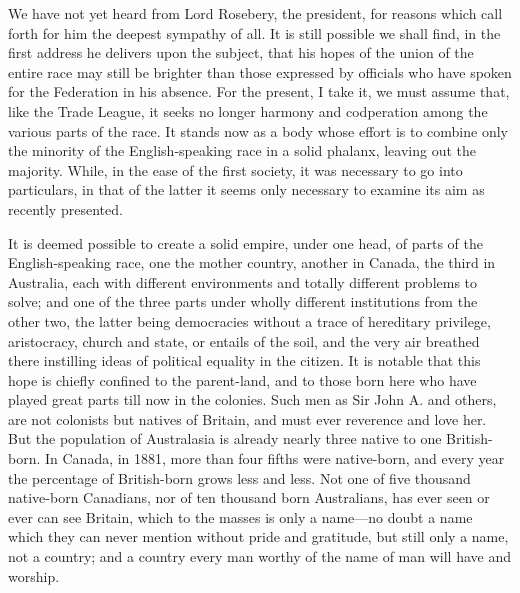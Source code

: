 \documentclass[11pt,openany]{book}
\begin{document}
We have not yet heard from Lord Rosebery, the president, for reasons which call forth for him the deepest sympathy of all. It is still possible we shall find, in the first address he delivers upon the subject, that his hopes of the union of the entire race may still be brighter than those expressed by officials who have spoken for the Federation in his absence. For the present, I take it, we must assume that, like the Trade League, it seeks no longer harmony and codperation among the various parts of the race. It stands now as a body whose effort is to combine only the minority of the English-speaking race in a solid phalanx, leaving out the majority. While, in the ease of the first society, it was necessary to go into particulars, in that of the latter it seems only necessary to examine its aim as recently presented.

It is deemed possible to create a solid empire, under one head, of parts of the English-speaking race, one the mother country, another in Canada, the third in Australia, each with different environments and totally different problems to solve; and one of the three parts under wholly different institutions from the other two, the latter being democracies without a trace of hereditary privilege, aristocracy, church and state, or entails of the soil, and the very air breathed there instilling ideas of political equality in the citizen. It is notable that this hope is chiefly confined to the parent-land, and to those born here who have played great parts till now in the colonies. Such men as Sir John A. and others, are not colonists but natives of Britain, and must ever reverence and love her. But the population of Australasia is already nearly three native to one British-born. In Canada, in 1881, more than four fifths were native-born, and every year the percentage of British-born grows less and less. Not one of five thousand native-born Canadians, nor of ten thousand born Australians, has ever seen or ever can see Britain, which to the masses is only a name---no doubt a name which they can never mention without pride and gratitude, but still only a name, not a country; and a country every man worthy of the name of man will have and worship.
\end{document}
